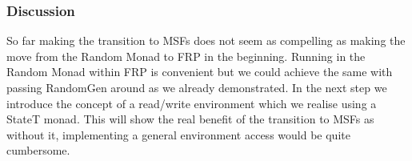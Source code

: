 \subsubsection{Discussion}
\begin{comment}
By making the transition to MSFs we can now stack arbitrary number of monads. As an example we could add a StateT monad on the type of AgentOut which would allow to conveniently manipulate the AgentOut e.g. in case where one sends more than one message or the construction of the final AgentOut is spread across multiple functions which allows easy composition. When implementing this, one needs to replace the dpSwitch with an individual implementation in which one runs the state monad isolated for each agent.
We could even add the IO monad if our agents require arbitrary IO e.g. reading/writing from files or communicating over TCP/IP. Although one could run in the IO Monad, one should not do so as one would loose all static guarantees about the reproducibility of the simulation. In ABS we need deterministic behaviour under all circumstances where repeated runs with the same initial conditions, including the random-number generator, should result in the same dynamics. If we allow the use of the IO Monad we loose the ability to guarantee the reproducibility at compile-time even if the agents never use IO facilities and just run in the IO for printing debug messages.
\end{comment}
So far making the transition to MSFs does not seem as compelling as making the move from the Random Monad to FRP in the beginning. Running in the Random Monad within FRP is convenient but we could achieve the same with passing RandomGen around as we already demonstrated. In the next step we introduce the concept of a read/write environment which we realise using a StateT monad. This will show the real benefit of the transition to MSFs as without it, implementing a general environment access would be quite cumbersome.